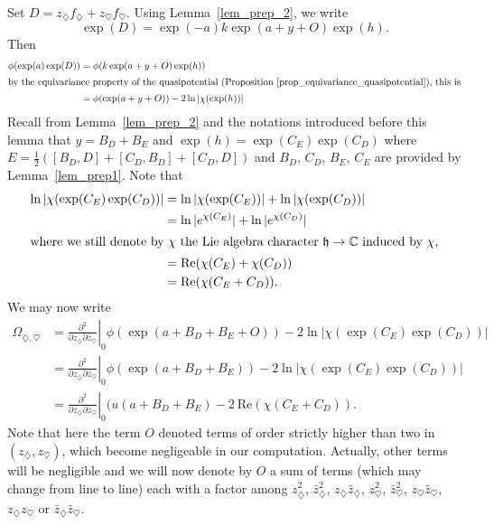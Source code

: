 \documentclass{amsart}
\theoremstyle{definition}
\begin{document}
Set $D=z_{\diamondsuit}f_{\diamondsuit} + z_{\heartsuit}f_{\heartsuit}$.
Using Lemma~\ref{lem_prep_2}, we write 
\[
\exp(D)= \exp(-a)k\exp(a+y+O)\exp(h)
.\]
Then 
\begin{align*}
\phi(\exp(a)\exp(D)) & = \phi(k\exp(a+y+O)\exp(h)) \\
\intertext{by the equivariance property of the quasipotential (Proposition~\ref{prop_equivariance_quasipotential}), 
this is}
& = \phi(\exp(a+y+O))-2\ln|\chi(\exp(h))|
\end{align*}
Recall from Lemma~\ref{lem_prep_2} and the notations introduced before this lemma 
that $y=B_D+B_E$ and $\exp(h)=\exp(C_E)\exp(C_D)$ where 
$E=\frac{1}{2}([B_D,D]+[C_D,B_D]+[C_D,D])$
and $B_D$, $C_D$, $B_E$, $C_E$ are provided by Lemma~\ref{lem_prep1}.  
Note that 
\begin{align*}
\ln|\chi(\exp(C_E)\exp(C_D))| &= \ln|\chi(\exp(C_E))|+\ln|\chi(\exp(C_D))| \\
& = \ln|e^{\chi(C_E)}|+\ln|e^{\chi(C_D)}| \\
\intertext{where we still denote by $\chi$ the Lie algebra character 
$\mathfrak{h}\rightarrow \mathbb{C}$ induced by $\chi$,}
& = \mathrm{Re}(\chi(C_E)+\chi(C_D)) \\
& = \mathrm{Re}(\chi(C_E+C_D)). 
\end{align*}
We may now write 
\begin{align*}
\Omega_{\diamondsuit,\bar{\heartsuit}} & = 
\left.\frac{\partial^2}{\partial z_{\diamondsuit} \partial \bar{z}_{\heartsuit}}\right|_0 
\phi(\exp(a+B_D+B_E+O))-2 \ln|\chi(\exp(C_E)\exp(C_D))| \\
& = 
\left.\frac{\partial^2}{\partial z_{\diamondsuit} \partial \bar{z}_{\heartsuit}}\right|_0 
\phi(\exp(a+B_D+B_E))-2 \ln|\chi(\exp(C_E)\exp(C_D))| \\
& = 
\left.\frac{\partial^2}{\partial z_{\diamondsuit} \partial \bar{z}_{\heartsuit}}\right|_0 
(u(a+B_D+B_E)-2\ \mathrm{Re}(\chi(C_E+C_D)).
\end{align*}
Note that here the term $O$ denoted terms of order strictly higher than two 
in $(z_{\diamondsuit},z_{\heartsuit})$, which become negligeable in our computation.
Actually, other terms will be negligible and we will now denote by $O$ a sum of terms 
(which may change from line to line) each with a factor among 
$z_{\diamondsuit}^2$, $\bar{z}_{\diamondsuit}^2$, $z_{\diamondsuit}\bar{z}_{\diamondsuit}$,
$z_{\heartsuit}^2$, $\bar{z}_{\heartsuit}^2$, $z_{\heartsuit}\bar{z}_{\heartsuit}$, 
$z_{\diamondsuit}z_{\heartsuit}$ or $\bar{z}_{\diamondsuit}\bar{z}_{\heartsuit}$.
\end{document}
